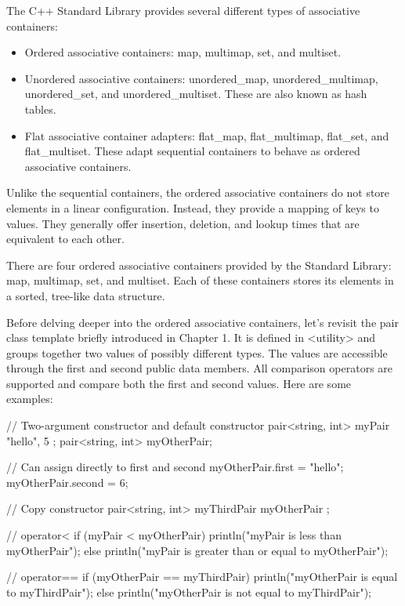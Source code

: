 

The C++ Standard Library provides several different types of associative containers:

\begin{itemize}
\item
Ordered associative containers: map, multimap, set, and multiset.

\item
Unordered associative containers: unordered\_map, unordered\_multimap, unordered\_set, and unordered\_multiset. These are also known as hash tables.


\item
Flat associative container adapters: flat\_map, flat\_multimap, flat\_set, and flat\_multiset. These adapt sequential containers to behave as ordered associative containers.
\end{itemize}


Unlike the sequential containers, the ordered associative containers do not store elements in a linear configuration. Instead, they provide a mapping of keys to values. They generally offer insertion, deletion, and lookup times that are equivalent to each other.

There are four ordered associative containers provided by the Standard Library: map, multimap, set, and multiset. Each of these containers stores its elements in a sorted, tree-like data structure.


Before delving deeper into the ordered associative containers, let’s revisit the pair class template briefly introduced in Chapter 1. It is defined in <utility> and groups together two values of possibly different types. The values are accessible through the first and second public data members. All comparison operators are supported and compare both the first and second values. Here are some examples:

\begin{cpp}
// Two-argument constructor and default constructor
pair<string, int> myPair { "hello", 5 };
pair<string, int> myOtherPair;

// Can assign directly to first and second
myOtherPair.first = "hello";
myOtherPair.second = 6;

// Copy constructor
pair<string, int> myThirdPair { myOtherPair };

// operator<
if (myPair < myOtherPair) {
    println("myPair is less than myOtherPair");
} else {
    println("myPair is greater than or equal to myOtherPair");
}

// operator==
if (myOtherPair == myThirdPair) {
    println("myOtherPair is equal to myThirdPair");
} else {
    println("myOtherPair is not equal to myThirdPair");
}
\end{cpp}

